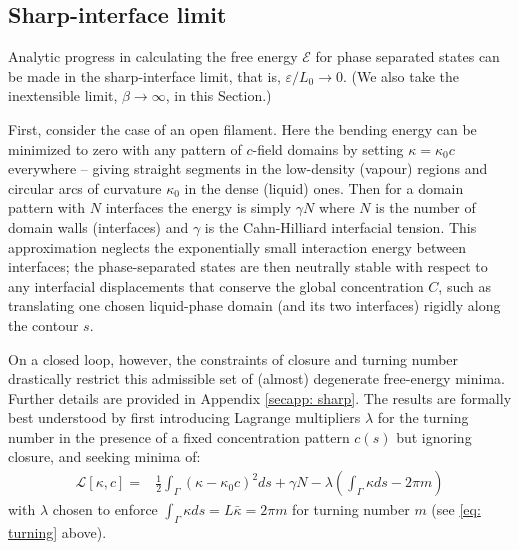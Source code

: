 \documentclass[
aip,
jcp,
reprint, 
floatfix
]{revtex4-1}
\begin{document}
\subsection{Sharp-interface limit}
Analytic progress in calculating the free energy $\mathcal{E}$ for phase separated states can be made in the sharp-interface limit, that is, $\varepsilon/L_0\to 0$. (We also take the inextensible limit, $\beta\to\infty$, in this Section.)

First, consider the case of an open filament. Here the bending energy can be minimized to zero with any pattern of $c$-field domains by setting $\kappa = \kappa_0 c$ everywhere -- giving straight segments in the low-density (vapour) regions and circular arcs of curvature $\kappa_0$ in the dense (liquid) ones. Then for a domain pattern with $N$ interfaces the energy is simply $\gamma N$ where $N$ is the number of domain walls (interfaces) and $\gamma$ is the Cahn-Hilliard interfacial tension. This approximation neglects the exponentially small interaction energy between interfaces; the phase-separated states are then neutrally stable with respect to any interfacial displacements that conserve the global concentration $C$, such as translating one chosen liquid-phase domain (and its two interfaces) rigidly along the contour $s$. 

On a closed loop, however, the constraints of closure and turning number drastically restrict this admissible set of (almost) degenerate free-energy minima.
Further details are provided in Appendix \ref{secapp: sharp}. The results are formally best understood by first introducing Lagrange multipliers $\lambda$ for the turning number in the presence of a fixed concentration pattern $c(s)$ but ignoring closure, and seeking minima of: 
\begin{equation}
\begin{split}
        \mathcal{L}[\kappa, c]=&\frac{1}{2} \int_{\Gamma}\left(\kappa-\kappa_0 c\right)^2 d s+\gamma N 
        -\lambda\left(\int_{\Gamma} \kappa d s - 2 \pi m \right)
\end{split}
\end{equation}
with $\lambda$ chosen to enforce
$
\int_{\Gamma} \kappa d s=L\bar\kappa
=2 \pi m$ for turning number $m$  (see \eqref{eq: turning} above).
\end{document}
